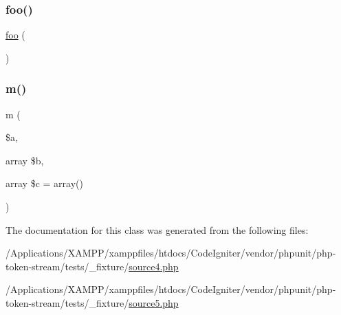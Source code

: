 \mbox{\label{classc_a79418a120498dd9cf915655654607747}} 
\subsubsection{\texorpdfstring{foo()}{foo()}}
{\footnotesize\ttfamily \mbox{\hyperlink{interfacefoo}{foo}} (\begin{DoxyParamCaption}{ }\end{DoxyParamCaption})}

\mbox{\label{classc_a0fd5ec041a095f0feb67e713f0685716}} 
\subsubsection{\texorpdfstring{m()}{m()}}
{\footnotesize\ttfamily m (\begin{DoxyParamCaption}\item[{}]{\$a,  }\item[{array}]{\$b,  }\item[{array}]{\$c = {\ttfamily array()} }\end{DoxyParamCaption})}



The documentation for this class was generated from the following files\+:\begin{DoxyCompactItemize}
\item 
/\+Applications/\+X\+A\+M\+P\+P/xamppfiles/htdocs/\+Code\+Igniter/vendor/phpunit/php-\/token-\/stream/tests/\+\_\+fixture/\mbox{\hyperlink{source4_8php}{source4.\+php}}\item 
/\+Applications/\+X\+A\+M\+P\+P/xamppfiles/htdocs/\+Code\+Igniter/vendor/phpunit/php-\/token-\/stream/tests/\+\_\+fixture/\mbox{\hyperlink{source5_8php}{source5.\+php}}\end{DoxyCompactItemize}
